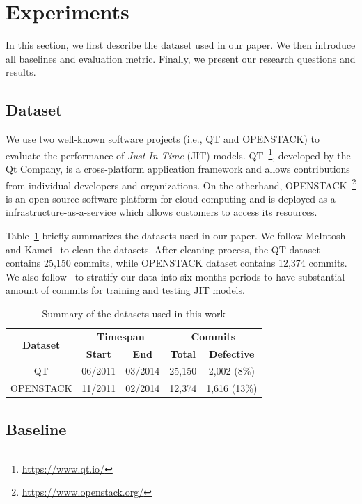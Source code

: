 \section{Experiments}
\label{sec:exp}
In this section, we first describe the dataset used in our paper. We then introduce all baselines and evaluation metric. Finally, we present our research questions and results.

\subsection{Dataset}
\label{sec:dataset}
We use two well-known software projects (i.e., QT and OPENSTACK) to evaluate the performance of \emph{Just-In-Time} (JIT) models. QT~\footnote{\url{https://www.qt.io/}}, developed by the Qt Company, is a cross-platform application framework and allows contributions from individual developers and organizations. On the otherhand, OPENSTACK~\footnote{\url{https://www.openstack.org/}} is an open-source software platform for cloud computing and is deployed as a infrastructure-as-a-service which allows customers to access its resources. 

Table~\ref{tab:data} briefly summarizes the datasets used in our paper. We follow McIntosh and Kamei~\cite{mcintosh2018fix} to clean the datasets. After cleaning process, the QT dataset contains 25,150 commits, while OPENSTACK dataset contains 12,374 commits. We also follow~\cite{mcintosh2018fix} to stratify our data into six months periods to have substantial amount of commits for training and testing JIT models. 

\begin{table}[t!]
  \centering
  \caption{Summary of the datasets used in this work}
    \begin{tabular}{|c|c|c|c|c|}
    \hline
    \multirow{2}[4]{*}{\textbf{Dataset}} & \multicolumn{2}{c|}{\textbf{Timespan}} & \multicolumn{2}{c|}{\textbf{Commits}} \\
\cline{2-5}          & \textbf{Start} & \textbf{End} & \textbf{Total} & \textbf{Defective} \\
    \hline
    \hline
    QT    & 06/2011 &  03/2014 & 25,150 & 2,002 (8\%) \\
    \hline
    OPENSTACK & 11/2011 &  02/2014 & 12,374 & 1,616 (13\%) \\
    \hline
    \end{tabular}%
  \label{tab:data}%
\end{table}%

\subsection{Baseline}
\label{sec:baseline}

